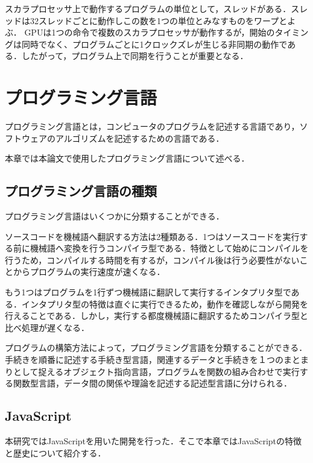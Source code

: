 \documentclass[a4j,12pt]{jsarticle}
\begin{document}
スカラプロセッサ上で動作するプログラムの単位として，スレッドがある．スレッドは32スレッドごとに動作しこの数を1つの単位とみなすものをワープとよぶ．
GPUは1つの命令で複数のスカラプロセッサが動作するが，開始のタイミングは同時でなく、プログラムごとに1クロックズレが生じる非同期の動作である．したがって，プログラム上で同期を行うことが重要となる．
\newpage

\section{プログラミング言語}
プログラミング言語とは，コンピュータのプログラムを記述する言語であり，ソフトウェアのアルゴリズムを記述するための言語である．

本章では本論文で使用したプログラミング言語について述べる．
\subsection{プログラミング言語の種類}
プログラミング言語はいくつかに分類することができる．

ソースコードを機械語へ翻訳する方法は2種類ある．1つはソースコードを実行する前に機械語へ変換を行うコンパイラ型である．特徴として始めにコンパイルを行うため，コンパイルする時間を有するが，コンパイル後は行う必要性がないことからプログラムの実行速度が速くなる．

もう1つはプログラムを1行ずつ機械語に翻訳して実行するインタプリタ型である．インタプリタ型の特徴は直ぐに実行できるため，動作を確認しながら開発を行えることである．しかし，実行する都度機械語に翻訳するためコンパイラ型と比べ処理が遅くなる．

プログラムの構築方法によって，プログラミング言語を分類することができる．手続きを順番に記述する手続き型言語，関連するデータと手続きを１つのまとまりとして捉えるオブジェクト指向言語，プログラムを関数の組み合わせで実行する関数型言語，データ間の関係や理論を記述する記述型言語に分けられる．

\subsection{JavaScript}
本研究ではJavaScriptを用いた開発を行った．そこで本章ではJavaScriptの特徴と歴史について紹介する．
\end{document}
